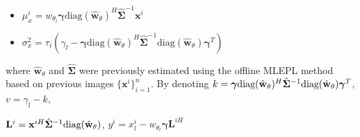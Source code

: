     \begin{itemize}
        \item $\mu_x^i = w_{\theta_{l}} \boldsymbol{\gamma} \text{diag}(\hat{\mathbf{w}}_{\theta})^H\hat{\mathbf{\Sigma}}^{-1} \mathbf{x}^i$
        \item $\sigma^2_x = \tau_i (\gamma_l - \boldsymbol{\gamma} \text{diag}(\hat{\mathbf{w}}_{\theta})^H \hat{\mathbf{\Sigma}}^{-1}  \text{diag}(\hat{\mathbf{w}}_{\theta}) \boldsymbol{\gamma}^T)$
    \end{itemize}
    \noindent
    where $\hat{\mathbf{w}}_{\theta}$ and $\hat{\mathbf{\Sigma}}$ were previously estimated using the offline \acs{MLEPL} method \citep{vu2023robust} based on previous images $\{\mathbf{x}^i\}_{i=1}^n$.%
    By denoting $\small k = \small \boldsymbol{\gamma} \text{diag}(\hat{\mathbf{w}}_{\theta})^H \hat{\mathbf{\Sigma}}^{-1} \text{diag}(\hat{\mathbf{w}}_{\theta}) \boldsymbol{\gamma}^T $, $v = \gamma_l -  k$,
    
    \noindent 
    $\small \mathbf{L}^i = \small \mathbf{x}^{iH} \hat{\mathbf{\Sigma}}^{-1} \text{diag}(\hat{\mathbf{w}}_{\theta})$, $y^i = x_{l}^i - w_{\theta_{l}} \boldsymbol{\gamma} \mathbf{L}^{iH}$
    
